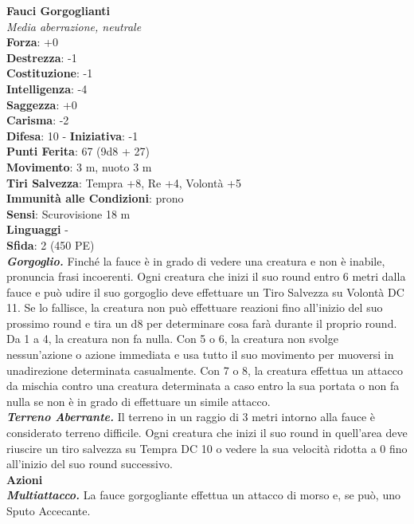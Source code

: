 \begin{multicols}{2}
\medskip\textbf{Fauci Gorgoglianti}\\
\emph{Media aberrazione, neutrale}\\
\textbf{Forza}: +0\\
\textbf{Destrezza}: -1\\
\textbf{Costituzione}: -1\\
\textbf{Intelligenza}: -4\\
\textbf{Saggezza}: +0\\
\textbf{Carisma}: -2\\
\textbf{Difesa}: 10 - \textbf{Iniziativa}: -1\\
\textbf{Punti Ferita}: 67 (9d8 + 27)\\
\textbf{Movimento}: 3 m, nuoto 3 m\\
\textbf{Tiri Salvezza}: Tempra +8, Re +4, Volontà +5\\
\textbf{Immunità alle Condizioni}: prono\\
\textbf{Sensi}: Scurovisione 18 m\\
\textbf{Linguaggi} -\\
\textbf{Sfida}: 2 (450 PE)\smallskip\\
\emph{\textbf{Gorgoglio.}} Finché la fauce è in grado di vedere una creatura e non è inabile, pronuncia frasi incoerenti. Ogni creatura che inizi il suo round entro 6 metri dalla fauce e può udire il suo gorgoglio deve effettuare un Tiro Salvezza su Volontà DC 11. Se lo fallisce, la creatura non può effettuare reazioni fino all'inizio del suo prossimo round e tira un d8 per determinare cosa farà durante il proprio round. Da 1 a 4, la creatura non fa nulla. Con 5 o 6, la creatura non svolge nessun'azione o azione immediata e usa tutto il suo movimento per muoversi in unadirezione determinata casualmente. Con 7 o  8, la creatura effettua un attacco da mischia contro una creatura determinata a caso entro la sua portata o non fa nulla se non è in grado di effettuare un simile attacco.\\
\emph{\textbf{Terreno Aberrante.}} Il terreno in un raggio di 3 metri intorno alla fauce è considerato terreno difficile. Ogni creatura che inizi il suo round in quell'area deve riuscire un tiro salvezza su Tempra DC 10 o vedere la sua velocità ridotta a 0 fino all'inizio del suo round successivo.\\
\smallskip\textbf{Azioni}\\
\emph{\textbf{Multiattacco.}} La fauce gorgogliante effettua un attacco di morso e, se può, uno Sputo Accecante.\\

\end{multicols}
